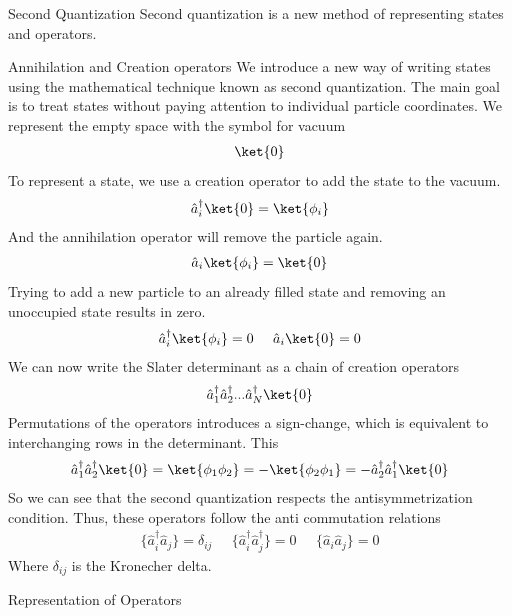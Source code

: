 \documentclass[twoside,english]{uiofysmaster}
\begin{document}
\begin{chapter}{Second Quantization}
 Second quantization is a new method of representing states and operators. 
 \begin{section}{Annihilation and Creation operators}
 	We introduce a new way of writing states using the mathematical technique known as second quantization. The main goal is to treat states without paying attention
  	to individual particle coordinates. We represent the empty space with the symbol for vacuum
  	\begin{align}
  		\ket{0}
  	\end{align}
  	To represent a state, we use a creation operator to add the state to the vacuum.
  	\begin{align}
  		\hat a_i^{\dagger} \ket{0} = \ket{\phi_i}
  	\end{align}
  	And the annihilation operator will remove the particle again. 
  	\begin{align}
  		\hat a_i \ket{\phi_i} = \ket{0}
  	\end{align}
  	Trying to add a new particle to an already filled state and removing an unoccupied state results in zero.
  	\begin{align}
  		\hat a_i^{\dagger} \ket{\phi_i} = 0 \;\;\;\;\; \hat a_i \ket{0} = 0
  	\end{align}
  	We can now write the Slater determinant as a chain of creation operators
  	\begin{align}
  		\hat a_1^{\dagger} \hat a_2^{\dagger}... \hat a_N^{\dagger} \ket{0}
  	\end{align}
  	Permutations of the operators introduces a sign-change, which is equivalent to interchanging rows in the determinant. This 
  	\begin{align}
  		\hat a_1^{\dagger} \hat a_2^{\dagger} \ket{0} = \ket{\phi_1 \phi_2} = -\ket{\phi_2 \phi_1} = -\hat a_2^{\dagger} \hat a_1^{\dagger} \ket{0}
  	\end{align}
  	So we can see that the second quantization respects the antisymmetrization condition. Thus, these operators follow the anti commutation relations
  	\begin{align}
  		\{ \hat a_i^{\dagger} \hat a_j \} = \delta_{ij} \;\;\;\;\; \{ \hat a^{\dagger}_i \hat a^{\dagger}_j \} = 0 \;\;\;\;\; \{ \hat a_i \hat a_j \} = 0
  	\end{align}
  	Where $\delta_{ij}$ is the Kronecher delta. 
 \end{section}

 \begin{section}{Representation of Operators}
 	

\end{section}
\end{chapter}
\end{document}
